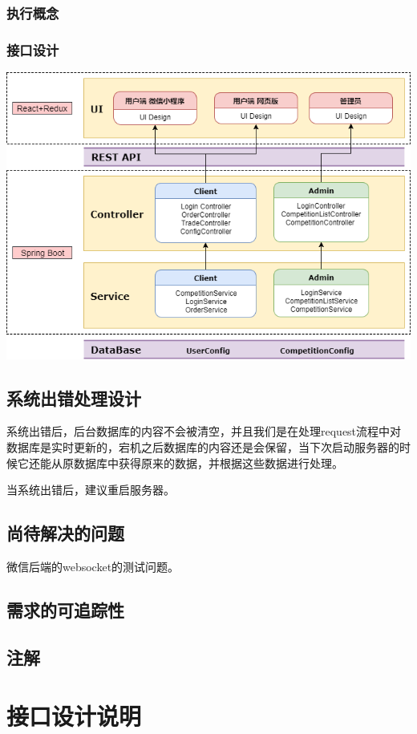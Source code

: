 \documentclass[12pt, a4paper,UTF8]{article}
\begin{document}
			\subsubsection{执行概念}
			\subsubsection{接口设计}
				\includegraphics[scale = .3]{架构图.png}
		\subsection{系统出错处理设计}
			系统出错后，后台数据库的内容不会被清空，并且我们是在处理request流程中对数据库是实时更新的，宕机之后数据库的内容还是会保留，当下次启动服务器的时候它还能从原数据库中获得原来的数据，并根据这些数据进行处理。

			当系统出错后，建议重启服务器。
		\subsection{尚待解决的问题}
			微信后端的websocket的测试问题。
		\subsection{需求的可追踪性}
		\subsection{注解}

	\section{接口设计说明}
		\label{接口设计说明}
\end{document}

